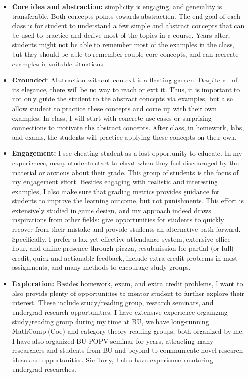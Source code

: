 \documentclass[11pt,a4paper,sans]{moderncv} %
\begin{document}
\begin{itemize}
  \item \textbf{Core idea and abstraction:} simplicity is engaging, and generality is transferable. 
  Both concepts points towards abstraction. 
  The end goal of each class is for student to understand a few simple and abstract concepts that can be used to practice and derive most of the topics in a course. 
  Years after, students might not be able to remember most of the examples in the class, but they should be able to remember couple core concepts, and can recreate examples in suitable situations.
  \item \textbf{Grounded:} Abstraction without context is a floating garden. Despite all of its elegance, there will be no way to reach or exit it.
  Thus, it is important to not only guide the student to the abstract concepts via examples, but also allow student to practice these concepts and come up with their own examples.
  In class, I will start with concrete use cases or surprising connections to motivate the abstract concepts. 
  After class, in homework, labs, and exams, the students will practice applying these concepts on their own.
  \item \textbf{Engagement:} I see cheating student as a lost opportunity to educate.
  In my experiences, many students start to cheat when they feel discouraged by the material or anxious about their grade. 
  This group of students is the focus of my engagement effort. 
  Besides engaging with realistic and interesting examples, I also make sure that grading metrics provides guidance for students to improve the learning outcome, but not punishments.
  This effort is extensively studied in game design, and my approach indeed draws inspirations from other fields: give opportunities for students to quickly recover from their mistake and provide students an alternative path forward.
  Specifically, I prefer a lax yet effective attendance system, extensive office hour, and online presence through piazza, resubmission for partial (or full) credit, quick and actionable feedback, include extra credit problems in most assignments, and many methods to encourage study groups. 
  \item \textbf{Exploration:} Besides homework, exam, and extra credit problems, I want to also provide plenty of opportunities to mentor student to further explore their interest. 
  These include study/reading group, research seminars, and undergrad research opportunities.
  I have extensive experience organizing study/reading group during my time at BU, we have long-running MathComp (Coq) and category theory reading groups, both organized by me. 
  I have also organized BU POPV seminar for years, attracting many researchers and students from BU and beyond to communicate novel research ideas and opportunities.
  Similarly, I also have experience mentoring undergrad researches.
\end{itemize}
\end{document}
